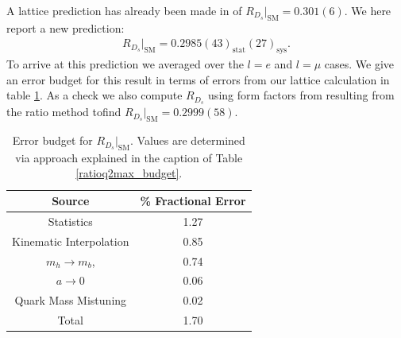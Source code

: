 A lattice prediction has already been made in \cite{Monahan:2017uby} of $R_{D_s}|_{\text{SM}} = 0.301(6)$. We here report a new prediction:
\begin{align}
  R_{D_s}|_{\text{SM}} = 0.2985(43)_{\text{stat}}(27)_{\text{sys}}.
  \label{eq:RDs}
\end{align}
To arrive at this prediction we averaged over the $l=e$ and $l=\mu$ cases. We give an error budget for this result in terms of errors from our lattice calculation in table \ref{RDs_budget}. As a check we also compute $R_{D_s}$ using form factors from resulting from the ratio method tofind $R_{D_s}|_{\text{SM}} = 0.2999(58)$.

\begin{table}[htb!]
  \begin{center}
    \begin{tabular}{c c}
      \hline
      Source & \% Fractional Error \\ [0.5ex]
      \hline
      Statistics & 1.27  \\ [1ex]
      Kinematic Interpolation & 0.85  \\ [1ex]
      $m_h \to m_b$, & 0.74  \\ [1ex]
      $a\to 0$ & 0.06  \\ [1ex]
      Quark Mass Mistuning & 0.02 \\ [1ex]
      \hline
      Total & 1.70 \\ [1ex]
      \hline
    \end{tabular}
  \end{center}
  \caption{Error budget for $R_{D_s}|_{\text{SM}}$. Values are determined via approach explained in the caption of Table \ref{ratioq2max_budget}. \label{RDs_budget}}
\end{table}



